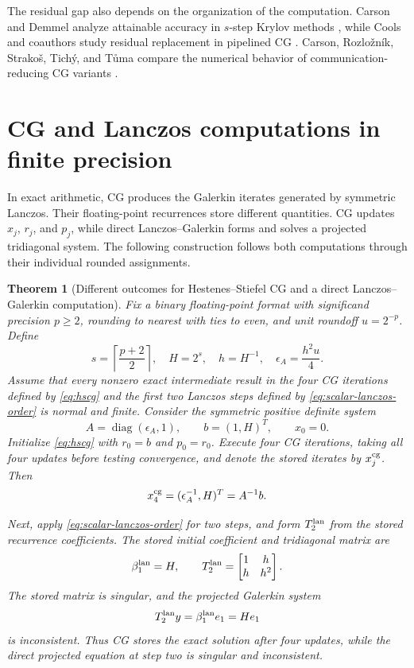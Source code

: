 \documentclass[11pt]{article}
\newtheorem{theorem}{Theorem}
\theoremstyle{definition}
\newcommand{\diag}{\operatorname{diag}}
\begin{document}
The residual gap also depends on the organization of the computation.
Carson and Demmel analyze attainable accuracy in $s$-step Krylov
methods \cite{CarsonDemmel2014}, while Cools and coauthors study
residual replacement in pipelined CG \cite{CoolsEtAl2018}.
Carson, Rozlo\v{z}n\'ik, Strako\v{s}, Tich\'y, and T\r{u}ma compare
the numerical behavior of communication-reducing CG variants
\cite{CarsonRozloznikStrakosTichyTuma2018}.
\section{CG and Lanczos computations in finite precision}

In exact arithmetic, CG produces the Galerkin iterates generated by
symmetric Lanczos.  Their floating-point recurrences store different
quantities.  CG updates $x_j$, $r_j$, and $p_j$, while direct
Lanczos--Galerkin forms and solves a projected tridiagonal system.
The following construction follows both computations through their
individual rounded assignments.

\begin{theorem}[Different outcomes for Hestenes--Stiefel CG and a direct Lanczos--Galerkin computation]
\label{thm:cg-lanczos-separation}
Fix a binary floating-point format with significand precision $p\ge2$,
rounding to nearest with ties to even, and unit roundoff $u=2^{-p}$.  Define
\[
 s=\left\lceil\frac{p+2}{2}\right\rceil,
 \quad H=2^s,
 \quad h=H^{-1},
 \quad \epsilon_A=\frac{h^2u}{4}.
\]
Assume that every nonzero exact intermediate result in the four CG iterations
defined by \eqref{eq:hscg} and the first two Lanczos steps defined by
\eqref{eq:scalar-lanczos-order} is normal and finite.  Consider the symmetric
positive definite system
\[
 A=\diag(\epsilon_A,1),\qquad b=(1,H)^T,\qquad x_0=0.
\]
Initialize \eqref{eq:hscg} with $r_0=b$ and $p_0=r_0$.  Execute four CG
iterations, taking all four updates before testing convergence, and denote the stored iterates by
$x_j^{\rm cg}$.  Then
\[
 x_4^{\rm cg}=(\epsilon_A^{-1},H)^T=A^{-1}b.
\]

Next, apply \eqref{eq:scalar-lanczos-order} for two steps, and form
$T_2^{\rm lan}$ from the stored recurrence coefficients.  The stored initial
coefficient and tridiagonal matrix are
\[
 \beta_1^{\rm lan}=H,
 \qquad
 T_2^{\rm lan}=\begin{bmatrix}1&h\\h&h^2\end{bmatrix}.
\]
The stored matrix is singular, and the projected Galerkin system
\[
 T_2^{\rm lan}y=\beta_1^{\rm lan}e_1=He_1
\]
is inconsistent.  Thus CG stores the exact solution after four updates,
while the direct projected equation at step two is singular and inconsistent.
\end{theorem}
\end{document}
